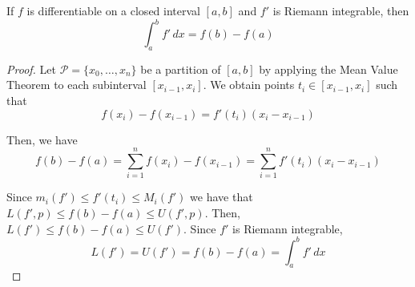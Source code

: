 \begin{theorem}{}{}
    If $f$ is differentiable on a closed interval $[a, b]$ and $f'$ is Riemann integrable, then $$\int_a^b f' \, dx = f(b) - f(a)$$
\end{theorem}
\begin{proof}
    Let $\mathcal{P} = \{x_0, \ldots, x_n\}$ be a partition of $[a, b]$ by applying the Mean Value Theorem to each subinterval $[x_{i - 1}, x_i]$. We obtain points $t_i \in [x_{i - 1}, x_i]$ such that $$f(x_i) - f(x_{i - 1}) = f'(t_i) (x_i - x_{i - 1})$$

    Then, we have $$f(b) - f(a) = \sum_{i = 1}^n f(x_i) - f(x_{i - 1}) = \sum_{i = 1}^n f'(t_i) (x_i - x_{i - 1})$$

    Since $m_i(f') \leq f'(t_i) \leq M_i(f')$ we have that $L(f', p) \leq f(b) - f(a) \leq U(f', p)$. Then, $L(f') \leq f(b) - f(a) \leq U(f')$. Since $f'$ is Riemann integrable, $$L(f') = U(f') = f(b) - f(a) = \int_a^b f' \, dx$$
\end{proof}